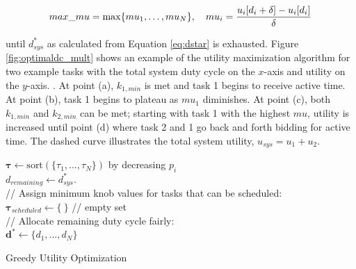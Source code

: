 \begin{equation}
max\_mu = \max\{mu_1,\ldots,mu_N\},~~~ mu_i = { u_i[d_i+\delta] - u_i[d_i]   \over \delta }
\end{equation}

until $d_{sys}^*$ as calculated from Equation \ref{eq:dstar} is exhausted. Figure \ref{fig:optimaldc_mult} shows an example of the utility maximization algorithm for two example tasks with the total system duty cycle on the $x$-axis and utility on the $y$-axis. .  At point (a), $k_{1,min}$ is met and task 1 begins to receive active time.  At point (b), task 1 begins to plateau as $mu_1$ diminishes.  At point (c), both $k_{1,min}$ and $k_{2,min}$ can be met; starting with task 1 with the highest $mu$, utility is increased until point (d) where task 2 and 1 go back and forth bidding for active time.  The dashed curve illustrates the total system utility, $u_{sys} = u_1 + u_2$. 

\begin{algorithm}[t]
\SetAlgoNoLine
{}
$\pmb{\tau} \leftarrow \text{sort}(\{\tau_1,\ldots,\tau_N\})$ by decreasing $p_i$\\
$d_{remaining} \leftarrow d_{sys}^*$.  \\
//{ Assign minimum knob values for tasks that can be scheduled:}\\
$\pmb{\tau}_{scheduled} \leftarrow \{~\}$ // empty set \\
 // Allocate remaining duty cycle fairly:\\
$\pmb{d}^* \leftarrow \{d_1,\ldots, d_N\}$
\caption{\label{alg}Greedy Utility Optimization}
\label{alg:one}
\end{algorithm}

